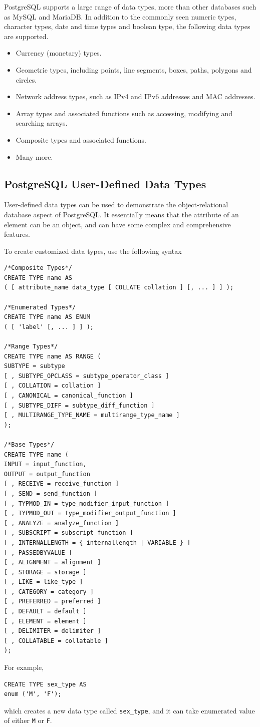 PostgreSQL supports a large range of data types, more than other databases such as MySQL and MariaDB. In addition to the commonly seen numeric types, character types, date and time types and boolean type, the following data types are supported.
\begin{itemize}
	\item Currency (monetary) types.
	\item Geometric types, including points, line segments, boxes, paths, polygons and circles.
	\item Network address types, such as IPv4 and IPv6 addresses and MAC addresses.
	\item Array types and associated functions such as accessing, modifying and searching arrays.
	\item Composite types and associated functions.
	\item Many more.
\end{itemize}

\subsection{PostgreSQL User-Defined Data Types}

User-defined data types can be used to demonstrate the object-relational database aspect of PostgreSQL. It essentially means that the attribute of an element can be an object, and can have some complex and comprehensive features.

To create customized data types, use the following syntax
\begin{lstlisting}
/*Composite Types*/
CREATE TYPE name AS
( [ attribute_name data_type [ COLLATE collation ] [, ... ] ] );

/*Enumerated Types*/
CREATE TYPE name AS ENUM
( [ 'label' [, ... ] ] );

/*Range Types*/
CREATE TYPE name AS RANGE (
SUBTYPE = subtype
[ , SUBTYPE_OPCLASS = subtype_operator_class ]
[ , COLLATION = collation ]
[ , CANONICAL = canonical_function ]
[ , SUBTYPE_DIFF = subtype_diff_function ]
[ , MULTIRANGE_TYPE_NAME = multirange_type_name ]
);

/*Base Types*/
CREATE TYPE name (
INPUT = input_function,
OUTPUT = output_function
[ , RECEIVE = receive_function ]
[ , SEND = send_function ]
[ , TYPMOD_IN = type_modifier_input_function ]
[ , TYPMOD_OUT = type_modifier_output_function ]
[ , ANALYZE = analyze_function ]
[ , SUBSCRIPT = subscript_function ]
[ , INTERNALLENGTH = { internallength | VARIABLE } ]
[ , PASSEDBYVALUE ]
[ , ALIGNMENT = alignment ]
[ , STORAGE = storage ]
[ , LIKE = like_type ]
[ , CATEGORY = category ]
[ , PREFERRED = preferred ]
[ , DEFAULT = default ]
[ , ELEMENT = element ]
[ , DELIMITER = delimiter ]
[ , COLLATABLE = collatable ]
);
\end{lstlisting}
For example,
\begin{lstlisting}
CREATE TYPE sex_type AS
enum ('M', 'F');
\end{lstlisting}
which creates a new data type called \verb|sex_type|, and it can take enumerated value of either \verb|M| or \verb|F|.

